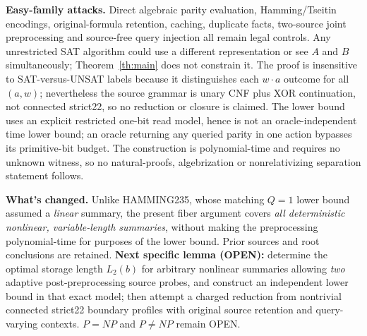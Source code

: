 \documentclass[10pt]{article}
\begin{document}
\noindent\textbf{Easy-family attacks.} Direct algebraic parity evaluation, Hamming/Tseitin encodings, original-formula retention, caching, duplicate facts, two-source joint preprocessing and source-free query injection all remain legal controls. Any unrestricted SAT algorithm could use a different representation or see $A$ and $B$ simultaneously; Theorem~\ref{th:main} does not constrain it. The proof is insensitive to SAT-versus-UNSAT labels because it distinguishes each $w\cdot a$ outcome for all $(a,w)$; nevertheless the source grammar is unary CNF plus XOR continuation, not connected strict22, so no reduction or closure is claimed. The lower bound uses an explicit restricted one-bit read model, hence is not an oracle-independent time lower bound; an oracle returning any queried parity in one action bypasses its primitive-bit budget. The construction is polynomial-time and requires no unknown witness, so no natural-proofs, algebrization or nonrelativizing separation statement follows.

\noindent\textbf{What's changed.} Unlike HAMMING235, whose matching $Q=1$ lower bound assumed a \emph{linear} summary, the present fiber argument covers \emph{all deterministic nonlinear, variable-length summaries}, without making the preprocessing polynomial-time for purposes of the lower bound. Prior sources and root conclusions are retained. \textbf{Next specific lemma (OPEN):} determine the optimal storage length $L_2(b)$ for arbitrary nonlinear summaries allowing \emph{two} adaptive post-preprocessing source probes, and construct an independent lower bound in that exact model; then attempt a charged reduction from nontrivial connected strict22 boundary profiles with original source retention and query-varying contexts. $P=NP$ and $P\ne NP$ remain OPEN.



\end{document}
